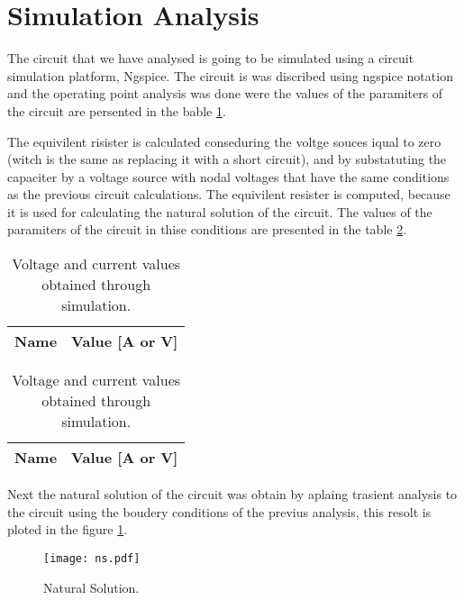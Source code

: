 \section{Simulation Analysis}
\label{sec:simulation}

The circuit that we have analysed is going to be simulated using a circuit simulation platform, Ngspice. The circuit is was discribed using ngspice notation and the operating point analysis was done were the values of the paramiters of the circuit are persented in the bable \ref{tab:op}.


The equivilent risister is calculated conseduring the voltge souces iqual to zero (witch is the same as replacing it with a short circuit), and by substatuting the capaciter by a voltage source with nodal voltages that have the same conditions as the previous circuit calculations. The equivilent resister is computed, because it is used for calculating the natural solution of the circuit. The values of the paramiters of the circuit in thise conditions are presented in the table \ref{tab:opV0}.


\begin{table}[H]
  \centering
  \begin{tabular}{|l|r|}
    \hline    
    {\bf Name} & {\bf Value [A or V]} \\ \hline
    
  \end{tabular}
  \caption{Voltage and current values obtained through simulation.}
  \label{tab:op}
\end{table}


\begin{table}[H]
  \centering
  \begin{tabular}{|l|r|}
    \hline    
    {\bf Name} & {\bf Value [A or V]} \\ \hline
    
  \end{tabular}
  \caption{Voltage and current values obtained through simulation.}
  \label{tab:opV0}
\end{table}

Next the natural solution of the circuit was obtain by aplaing trasient analysis to the circuit using the boudery conditions of the previus analysis, this resolt is ploted in the figure \ref{Fig1:ns}.

\begin{figure}[H] \centering
\texttt{[image: ns.pdf]}
\caption{Natural Solution.}
\label{Fig1:ns}
\end{figure}

